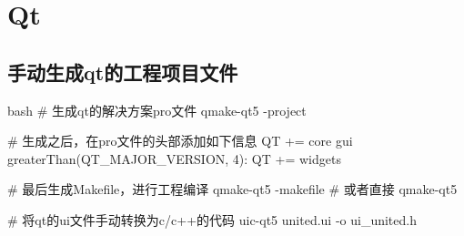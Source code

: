 \chapter{Qt}
\section{手动生成qt的工程项目文件}
\begin{code-block}{bash}
# 生成qt的解决方案pro文件
qmake-qt5 -project

# 生成之后，在pro文件的头部添加如下信息
QT       += core gui
greaterThan(QT_MAJOR_VERSION, 4): QT += widgets

# 最后生成Makefile，进行工程编译
qmake-qt5 -makefile
# 或者直接
qmake-qt5

# 将qt的ui文件手动转换为c/c++的代码
uic-qt5 united.ui -o ui_united.h
\end{code-block}
